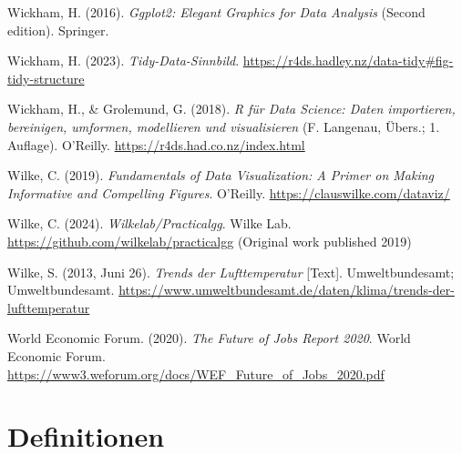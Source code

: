 \documentclass[
  letterpaper,
  oneside,
  open=any]{scrbook}
\newlength{\cslhangindent}
\newenvironment{CSLReferences}[2] %
 {\begin{list}{}{%
  \setlength{\itemindent}{0pt}
  \setlength{\leftmargin}{0pt}
  \setlength{\parsep}{0pt}
  \ifodd #1
   \setlength{\leftmargin}{\cslhangindent}
   \setlength{\itemindent}{-1\cslhangindent}
  \fi
  \setlength{\itemsep}{#2\baselineskip}}}
 {\end{list}}
\theoremstyle{definition}
\theoremstyle{definition}
\theoremstyle{definition}
\theoremstyle{remark}
\begin{document}
\begin{CSLReferences}{1}{0}
Wickham, H. (2016). \emph{Ggplot2: Elegant Graphics for Data Analysis}
(Second edition). Springer.

Wickham, H. (2023). \emph{Tidy-{Data-Sinnbild}}.
\url{https://r4ds.hadley.nz/data-tidy\#fig-tidy-structure}

Wickham, H., \& Grolemund, G. (2018). \emph{R für Data Science: Daten
importieren, bereinigen, umformen, modellieren und visualisieren} (F.
Langenau, Übers.; 1. Auflage). O'Reilly.
\url{https://r4ds.had.co.nz/index.html}

Wilke, C. (2019). \emph{Fundamentals of Data Visualization: A Primer on
Making Informative and Compelling Figures}. O'Reilly.
\url{https://clauswilke.com/dataviz/}

Wilke, C. (2024). \emph{Wilkelab/Practicalgg}. Wilke Lab.
\url{https://github.com/wilkelab/practicalgg} (Original work published
2019)

Wilke, S. (2013, Juni 26). \emph{Trends der Lufttemperatur} {[}Text{]}.
Umweltbundesamt; Umweltbundesamt.
\url{https://www.umweltbundesamt.de/daten/klima/trends-der-lufttemperatur}

World Economic Forum. (2020). \emph{The {Future} of {Jobs Report} 2020}.
World Economic Forum.
\url{https://www3.weforum.org/docs/WEF_Future_of_Jobs_2020.pdf}

\end{CSLReferences}

\cleardoublepage
{}
{}
\appendix

\chapter{Definitionen}\label{definitionen}
\end{document}
